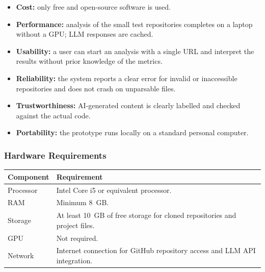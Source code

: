 \documentclass[12pt,a4paper]{article}
\begin{document}
\begin{itemize}[leftmargin=*,itemsep=2pt]
  \item \textbf{Cost:} only free and open-source software is used.

  \item \textbf{Performance:} analysis of the small test repositories
        completes on a laptop without a GPU; LLM responses are cached.

  \item \textbf{Usability:} a user can start an analysis with a single
        URL and interpret the results without prior knowledge of the metrics.

  \item \textbf{Reliability:} the system reports a clear error for invalid
        or inaccessible repositories and does not crash on unparsable files.

  \item \textbf{Trustworthiness:} AI-generated content is clearly labelled
        and checked against the actual code.

  \item \textbf{Portability:} the prototype runs locally on a standard
        personal computer.
\end{itemize}

\subsubsection{Hardware Requirements}

\begin{table}[H]
\centering
\label{tab:hw}
\renewcommand{\arraystretch}{1.4}
\setlength{\tabcolsep}{8pt}

\begin{tabular}{|L{1.6in}|L{3.75in}|}
\hline
\textbf{Component} & \textbf{Requirement} \\
\hline
Processor & Intel Core i5 or equivalent processor. \\
\hline
RAM & Minimum 8~GB. \\
\hline
Storage & At least 10~GB of free storage for cloned repositories and project files. \\
\hline
GPU & Not required. \\
\hline
Network & Internet connection for GitHub repository access and LLM API integration. \\
\hline
\end{tabular}
\end{table}
\end{document}
